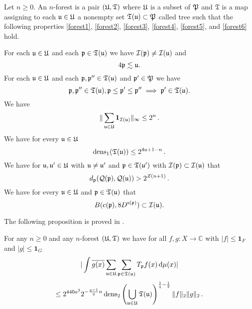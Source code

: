 Let $n\ge 0$.
An $n$-forest is a pair $({\mathfrak U}, \mathfrak{T})$
where ${\mathfrak U}$ is a subset of ${\mathfrak P}$
and $\mathfrak{T}$ is a map assigning to
each ${\mathfrak u}\in {\mathfrak U}$ a nonempty set ${\mathfrak T} ({\mathfrak u})\subset {\mathfrak P}$ called tree
such that the following properties
\eqref{forest1}, \eqref{forest2},
\eqref{forest3},
\eqref{forest4},
\eqref{forest5}, and
\eqref{forest6}
hold.

For each ${\mathfrak u}\in {\mathfrak U}$ and each ${\mathfrak p}\in {\mathfrak T}({\mathfrak u})$
we have ${\mathcal{I}}({\mathfrak p}) \ne {\mathcal{I}}({\mathfrak u})$ and
\begin{equation}\label{forest1}
    4{\mathfrak p}\lesssim {\mathfrak u}.
\end{equation}
For each ${\mathfrak u} \in {\mathfrak U}$ and each ${\mathfrak p},{\mathfrak p}''\in {\mathfrak T}({\mathfrak u})$ and ${\mathfrak p}'\in {\mathfrak P}$
we have
\begin{equation}\label{forest2}
    {\mathfrak p}, {\mathfrak p}'' \in \mathfrak{T}({\mathfrak u}), {\mathfrak p} \leq {\mathfrak p}' \leq {\mathfrak p}'' \implies {\mathfrak p}' \in \mathfrak{T}({\mathfrak u}).
\end{equation}
We have
\begin{equation}\label{forest3}
   \|\sum_{{\mathfrak u}\in {\mathfrak U}} \mathbf{1}_{{\mathcal{I}}({\mathfrak u})}\|_\infty \leq 2^n\,.
\end{equation}
We have for every ${\mathfrak u}\in {\mathfrak U}$
\begin{equation}\label{forest4}
    \operatorname{\operatorname{dens}}_1({\mathfrak T}({\mathfrak u}))\le 2^{4a + 1-n}\, .
\end{equation}
We have for ${\mathfrak u}, {\mathfrak u}'\in {\mathfrak U}$ with ${\mathfrak u}\neq {\mathfrak u}'$ and ${\mathfrak p}\in {\mathfrak T}({\mathfrak u}')$ with ${\mathcal{I}}({\mathfrak p})\subset {\mathcal{I}}({\mathfrak u})$ that
\begin{equation}\label{forest5}
    d_{{\mathfrak p}}({\mathcal{Q}}({\mathfrak p}), {\mathcal{Q}}({\mathfrak u}))>2^{Z(n+1)}\, .
\end{equation}
We have for every ${\mathfrak u}\in {\mathfrak U}$ and ${\mathfrak p}\in {\mathfrak T}({\mathfrak u})$ that
\begin{equation}\label{forest6}
    B({\mathrm{c}}({\mathfrak p}), 8D^{{\mathrm{s}}({\mathfrak p})})\subset {\mathcal{I}}({\mathfrak u}).
\end{equation}


The following proposition is proved in .
\begin{proposition}
\label{forest-operator}
\leanok
{}
For any $n\ge 0$ and any $n$-forest $({\mathfrak U},{\mathfrak T})$ we have for all $f,g: X \to \mathbb{C}$ with $|f| \le \mathbf{1}_F$ and $|g| \le \mathbf{1}_G$
$$
    | \int \overline{g(x)} \sum_{{\mathfrak u}\in {\mathfrak U}} \sum_{{\mathfrak p}\in {\mathfrak T}({\mathfrak u})} T_{{\mathfrak p}} f(x) \, \mathrm{d}\mu(x)|
$$
$$
    \le
    2^{440a^3}2^{-\frac{q-1}{q} n} \operatorname{\operatorname{dens}}_2\left(\bigcup_{{\mathfrak u}\in {\mathfrak U}}{\mathfrak T}({\mathfrak u})\right)^{\frac{1}{q}-\frac{1}{2}} \|f\|_2 \|g\|_2 \,.
$$
\end{proposition}

